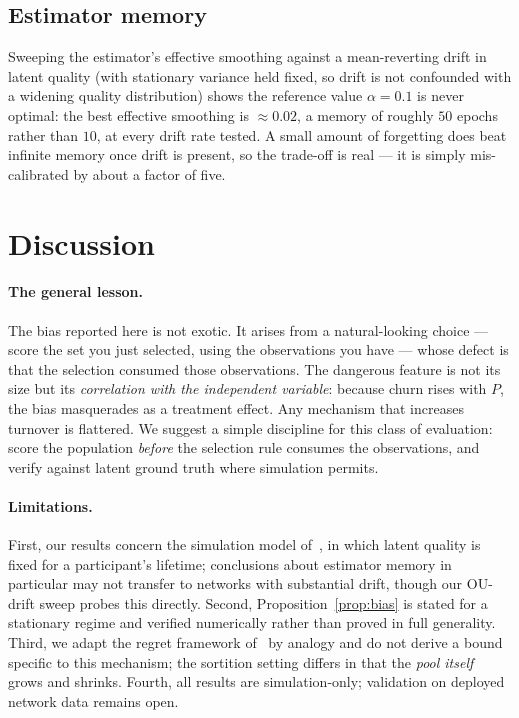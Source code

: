 \documentclass[10pt,twocolumn]{article}
\begin{document}
\subsection{Estimator memory}
Sweeping the estimator's effective smoothing against a mean-reverting drift in latent
quality (with stationary variance held fixed, so drift is not confounded with a
widening quality distribution) shows the reference value $\alpha=0.1$ is never optimal:
the best effective smoothing is $\approx0.02$, a memory of roughly $50$ epochs rather
than $10$, at every drift rate tested. A small amount of forgetting does beat infinite
memory once drift is present, so the trade-off is real --- it is simply mis-calibrated
by about a factor of five.

\section{Discussion}

\paragraph{The general lesson.}
The bias reported here is not exotic. It arises from a natural-looking choice --- score
the set you just selected, using the observations you have --- whose defect is that the
selection consumed those observations. The dangerous feature is not its size but its
\emph{correlation with the independent variable}: because churn rises with $P$, the
bias masquerades as a treatment effect. Any mechanism that increases turnover is
flattered. We suggest a simple discipline for this class of evaluation: score the
population \emph{before} the selection rule consumes the observations, and verify
against latent ground truth where simulation permits.

\paragraph{Limitations.}
First, our results concern the simulation model of~\cite{kruijssen2024}, in which
latent quality is fixed for a participant's lifetime; conclusions about estimator
memory in particular may not transfer to networks with substantial drift, though our
OU-drift sweep probes this directly. Second, Proposition~\ref{prop:bias} is stated for
a stationary regime and verified numerically rather than proved in full generality.
Third, we adapt the regret framework of~\cite{chen2013} by analogy and do not derive a
bound specific to this mechanism; the sortition setting differs in that the
\emph{pool itself} grows and shrinks. Fourth, all results are simulation-only;
validation on deployed network data remains open.
\end{document}
